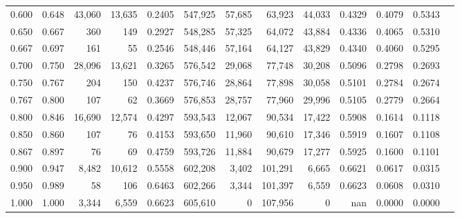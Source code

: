 \begin{tabular}{rrrrrrrrrrrrr}
0.600 & 0.648 & 43,060 & 13,635 &                                     0.2405 & 547,925 &  57,685 &  63,923 &  44,033 & 0.4329 & 0.4079 & 0.5343 \\
0.650 & 0.667 &    360 &    149 &                                     0.2927 & 548,285 &  57,325 &  64,072 &  43,884 & 0.4336 & 0.4065 & 0.5310 \\
0.667 & 0.697 &    161 &     55 &                                     0.2546 & 548,446 &  57,164 &  64,127 &  43,829 & 0.4340 & 0.4060 & 0.5295 \\
0.700 & 0.750 & 28,096 & 13,621 &                                     0.3265 & 576,542 &  29,068 &  77,748 &  30,208 & 0.5096 & 0.2798 & 0.2693 \\
0.750 & 0.767 &    204 &    150 &                                     0.4237 & 576,746 &  28,864 &  77,898 &  30,058 & 0.5101 & 0.2784 & 0.2674 \\
0.767 & 0.800 &    107 &     62 &                                     0.3669 & 576,853 &  28,757 &  77,960 &  29,996 & 0.5105 & 0.2779 & 0.2664 \\
0.800 & 0.846 & 16,690 & 12,574 &                                     0.4297 & 593,543 &  12,067 &  90,534 &  17,422 & 0.5908 & 0.1614 & 0.1118 \\
0.850 & 0.860 &    107 &     76 &                                     0.4153 & 593,650 &  11,960 &  90,610 &  17,346 & 0.5919 & 0.1607 & 0.1108 \\
0.867 & 0.897 &     76 &     69 &                                     0.4759 & 593,726 &  11,884 &  90,679 &  17,277 & 0.5925 & 0.1600 & 0.1101 \\
0.900 & 0.947 &  8,482 & 10,612 &                                     0.5558 & 602,208 &   3,402 & 101,291 &   6,665 & 0.6621 & 0.0617 & 0.0315 \\
0.950 & 0.989 &     58 &    106 &                                     0.6463 & 602,266 &   3,344 & 101,397 &   6,559 & 0.6623 & 0.0608 & 0.0310 \\
1.000 & 1.000 &  3,344 &  6,559 &                                     0.6623 & 605,610 &       0 & 107,956 &       0 &    nan & 0.0000 & 0.0000 \\
\bottomrule
\end{tabular}

